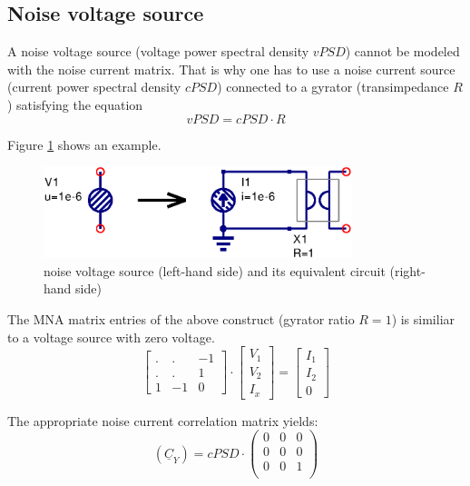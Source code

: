 \subsection{Noise voltage source}

A noise voltage source (voltage power spectral density $vPSD$) cannot
be modeled with the noise current matrix.  That is why one has to use
a noise current source (current power spectral density $cPSD$)
connected to a gyrator (transimpedance $R$) satisfying the equation
\begin{equation}
vPSD = cPSD \cdot R
\end{equation}

Figure \ref{fig:Unoise} shows an example.
\begin{figure}[ht]
\begin{center}
\includegraphics[width=9cm]{Unoise}
\end{center}
\caption{noise voltage source (left-hand side) and its equivalent circuit (right-hand side)}
\label{fig:Unoise}
\end{figure}
\FloatBarrier

The MNA matrix entries of the above construct (gyrator ratio $R=1$) is
similiar to a voltage source with zero voltage.
\begin{equation}
\begin{bmatrix}
.&.& -1\\
.&.& 1\\
1 & -1 & 0
\end{bmatrix}
\cdot
\begin{bmatrix}
V_{1}\\
V_{2}\\
I_x
\end{bmatrix}
=
\begin{bmatrix}
I_{1}\\
I_{2}\\
0
\end{bmatrix}
\end{equation}

The appropriate noise current correlation matrix yields:
\begin{equation}
(\underline{C}_Y) = cPSD \cdot
\begin{pmatrix}
 0 & 0 & 0\\
 0 & 0 & 0\\
 0 & 0 & 1\\
\end{pmatrix}
\end{equation}

